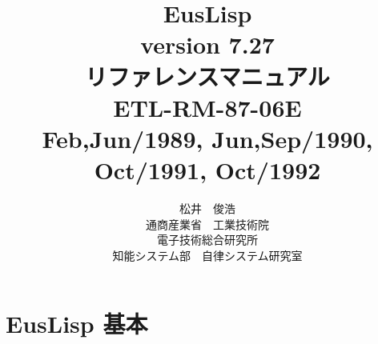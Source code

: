 \newcommand{\fundesc}[2]{\functiondescription{#1}{#2}{関数}{\hspace{0mm}}}
\newcommand{\macdesc}[2]{\functiondescription{#1}{#2}{マクロ}{\hspace{0mm}}}
\newcommand{\spedesc}[2]{\functiondescription{#1}{#2}{特殊}{\hspace{0mm}}}
\newcommand{\metdesc}[2]{\functiondescription{#1}{#2}{メソッド}{\hspace{0mm}}}

\newcommand{\constdesc}[2]{\functiondescription{#1}{}{定数}{#2}}

\newcommand{\classdesc}[4]{	%
\index{#1}
{\Large {\bf #1 }} \hfill [クラス]  %
\begin{tabbing}
\hspace{30mm} :super \hspace{5mm} \= {\bf #2} \\
\hspace{30mm} :slots \> #3 
\end{tabbing}
\vspace{4mm}
\desclist{#4}}

\newenvironment{refdesc}{
 \vspace{5mm} \parindent=0mm \topsep=0mm \parskip=0mm \leftmargin=10mm}{
             \parindent=10mm \topsep=3mm \parskip=1mm \leftmargin=0mm }


\title{\LARGE \bf EusLisp \\
{\large \bf version 7.27} \\
\bf リファレンスマニュアル \\
\vspace{5mm}
\normalsize
ETL-RM-87-06E \\
Feb,Jun/1989, Jun,Sep/1990, Oct/1991, Oct/1992  \\ }
\author{松井　俊浩 \\
{\small 通商産業省　工業技術院}\\
電子技術総合研究所 \\
知能システム部　自律システム研究室}
\thispagestyle{empty}
\maketitle
{}
\tableofcontents

\newpage
{}
\part{EusLisp 基本}
\newpage
%
%




%
\cleardoublepage
\footnotesize
\printindex


